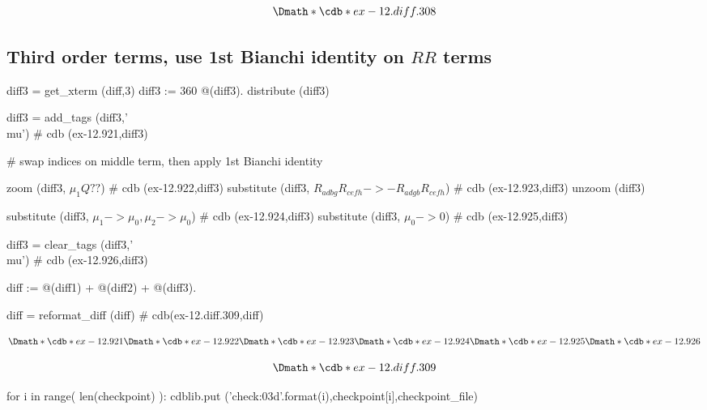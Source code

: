 \documentclass[12pt]{cdblatex}
\begin{document}
\begin{dgroup*}
   \Dmath*{\cdb*{ex-12.diff.308}}
\end{dgroup*}

\clearpage

\subsection*{Third order terms, use 1st Bianchi identity on $R R$ terms}

\begin{cadabra}
   diff3  = get_xterm (diff,3)
   diff3 := 360 @(diff3).
   distribute (diff3)

   diff3 = add_tags (diff3,'\\mu')                                              # cdb (ex-12.921,diff3)

   # swap indices on middle term, then apply 1st Bianchi identity

   zoom       (diff3, $\mu_{1} Q??$)                                            # cdb (ex-12.922,diff3)
   substitute (diff3, $R_{a d b g} R_{c e f h} -> - R_{a d g b} R_{c e f h}$)   # cdb (ex-12.923,diff3)
   unzoom     (diff3)

   substitute (diff3, $\mu_{1} -> \mu_{0}, \mu_{2} -> \mu_{0}$)                 # cdb (ex-12.924,diff3)
   substitute (diff3, $\mu_{0} -> 0$)                                           # cdb (ex-12.925,diff3)

   diff3 = clear_tags (diff3,'\\mu')                                            # cdb (ex-12.926,diff3)

   diff := @(diff1) + @(diff2) + @(diff3).

   diff  = reformat_diff (diff)                                                 # cdb(ex-12.diff.309,diff)
\end{cadabra}

\clearpage

\begin{dgroup*}
   \Dmath*{\cdb*{ex-12.921}}
   \Dmath*{\cdb*{ex-12.922}}
   \Dmath*{\cdb*{ex-12.923}}
   \Dmath*{\cdb*{ex-12.924}}
   \Dmath*{\cdb*{ex-12.925}}
   \Dmath*{\cdb*{ex-12.926}}
\end{dgroup*}

\begin{dgroup*}
   \Dmath*{\cdb*{ex-12.diff.309}}
\end{dgroup*}

\clearpage


\bgroup
{}
\begin{cadabra}
   for i in range( len(checkpoint) ):
      cdblib.put ('check{:03d}'.format(i),checkpoint[i],checkpoint_file)
\end{cadabra}
\egroup
\end{document}
